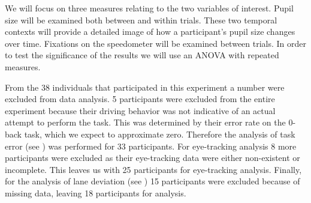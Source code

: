 We will focus on three measures relating to the two variables of interest. 
Pupil size will be examined both between and within trials.
These two temporal contexts will provide a detailed image of how a participant's pupil size changes over time.
Fixations on the speedometer will be examined between trials. 
In order to test the significance of the results we will use an ANOVA with repeated measures.

From the 38 individuals that participated in this experiment a number were excluded from data analysis.
5 participants were excluded from the entire experiment because their driving behavior was not indicative of an actual attempt to perform the task.
This was determined by their error rate on the 0-back task, which we expect to approximate zero.
Therefore the analysis of task error (see \citealp{DeMooij2021}) was performed for 33 participants.
For eye-tracking analysis 8 more participants were excluded as their eye-tracking data were either non-existent or incomplete.
This leaves us with 25 participants for eye-tracking analysis.
Finally, for the analysis of lane deviation (see \citealp{Kelapanda2021}) 15 participants were excluded because of missing data, leaving 18 participants for analysis.